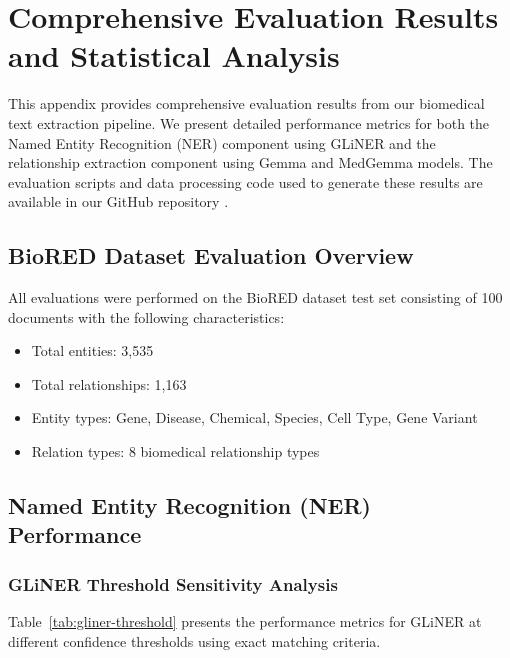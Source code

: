 
\chapter{Comprehensive Evaluation Results and Statistical Analysis}

\label{AppendixA} %

This appendix provides comprehensive evaluation results from our biomedical text extraction pipeline. We present detailed performance metrics for both the Named Entity Recognition (NER) component using GLiNER and the relationship extraction component using Gemma and MedGemma models. The evaluation scripts and data processing code used to generate these results are available in our GitHub repository \cite{githubthesis2025}.

\section{BioRED Dataset Evaluation Overview}

All evaluations were performed on the BioRED dataset test set consisting of 100 documents with the following characteristics:
\begin{itemize}
    \item Total entities: 3,535
    \item Total relationships: 1,163
    \item Entity types: Gene, Disease, Chemical, Species, Cell Type, Gene Variant
    \item Relation types: 8 biomedical relationship types
\end{itemize}

\section{Named Entity Recognition (NER) Performance}

\subsection{GLiNER Threshold Sensitivity Analysis}

Table~\ref{tab:gliner-threshold} presents the performance metrics for GLiNER at different confidence thresholds using exact matching criteria.

